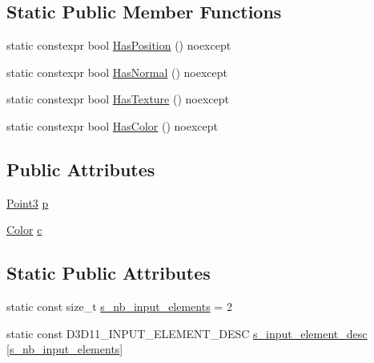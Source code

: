 \subsection*{Static Public Member Functions}
\begin{DoxyCompactItemize}
\item 
static constexpr bool \hyperlink{structmage_1_1_vertex_position_color_a254be63b468600a4a60639644d34086b}{Has\+Position} () noexcept
\item 
static constexpr bool \hyperlink{structmage_1_1_vertex_position_color_a53289aa86f3de21ba083d33dd18fafb8}{Has\+Normal} () noexcept
\item 
static constexpr bool \hyperlink{structmage_1_1_vertex_position_color_a34d7619b86890e49bd7678d333a50eef}{Has\+Texture} () noexcept
\item 
static constexpr bool \hyperlink{structmage_1_1_vertex_position_color_ae009d24a1a0fe1b60be9139c8ea62e5c}{Has\+Color} () noexcept
\end{DoxyCompactItemize}
\subsection*{Public Attributes}
\begin{DoxyCompactItemize}
\item 
\hyperlink{structmage_1_1_point3}{Point3} \hyperlink{structmage_1_1_vertex_position_color_afe40a78afb8e13e742d93d5092b1a614}{p}
\item 
\hyperlink{structmage_1_1_color}{Color} \hyperlink{structmage_1_1_vertex_position_color_a4a9e50e66f73e93a9a529c0c940e2458}{c}
\end{DoxyCompactItemize}
\subsection*{Static Public Attributes}
\begin{DoxyCompactItemize}
\item 
static const size\+\_\+t \hyperlink{structmage_1_1_vertex_position_color_ab59f4ce0c11158a904232371f8f7bbd1}{s\+\_\+nb\+\_\+input\+\_\+elements} = 2
\item 
static const D3\+D11\+\_\+\+I\+N\+P\+U\+T\+\_\+\+E\+L\+E\+M\+E\+N\+T\+\_\+\+D\+E\+SC \hyperlink{structmage_1_1_vertex_position_color_a0cc09950718850b64339c5fd5130ff9a}{s\+\_\+input\+\_\+element\+\_\+desc} \mbox{[}\hyperlink{structmage_1_1_vertex_position_color_ab59f4ce0c11158a904232371f8f7bbd1}{s\+\_\+nb\+\_\+input\+\_\+elements}\mbox{]}
\end{DoxyCompactItemize}


